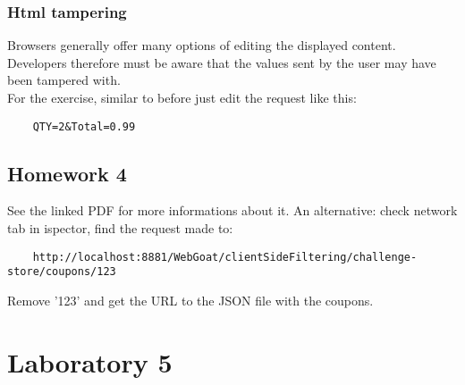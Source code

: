 \documentclass[a4paper, 10pt, titlepage]{article}
\begin{document}
\subsubsection*{Html tampering}
Browsers generally offer many options of editing the displayed content. Developers therefore must be aware that the values sent by the user may have been tampered with. \\
For the exercise, similar to before just edit the request like this:
\begin{lstlisting}
	QTY=2&Total=0.99
\end{lstlisting}

\subsection{Homework 4}
	See the linked PDF for more informations about it. An alternative: check network tab in ispector, find the request made to:
\begin{verbatim}
	http://localhost:8881/WebGoat/clientSideFiltering/challenge-store/coupons/123
\end{verbatim}	 
Remove '123' and get the URL to the JSON file with the coupons.

\section{Laboratory 5}
\end{document}
